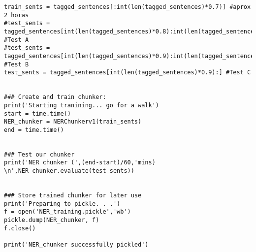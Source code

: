 \documentclass{pre-tfg}
\begin{document}
\begin{lstlisting}[style=consola]
train_sents = tagged_sentences[:int(len(tagged_sentences)*0.7)] #aprox 2 horas
#test_sents = tagged_sentences[int(len(tagged_sentences)*0.8):int(len(tagged_sentences)*0.7)] #Test A
#test_sents = tagged_sentences[int(len(tagged_sentences)*0.9):int(len(tagged_sentences)*0.8)] #Test B
test_sents = tagged_sentences[int(len(tagged_sentences)*0.9):] #Test C


### Create and train chunker:
print('Starting tranining... go for a walk')
start = time.time()
NER_chunker = NERChunkerv1(train_sents)
end = time.time()


### Test our chunker
print('NER chunker (',(end-start)/60,'mins) \n',NER_chunker.evaluate(test_sents))


### Store trained chunker for later use
print('Preparing to pickle. . .')
f = open('NER_training.pickle','wb')
pickle.dump(NER_chunker, f)
f.close()

print('NER_chunker successfully pickled')

\end{lstlisting}

\cleardoublepage
\end{document}
